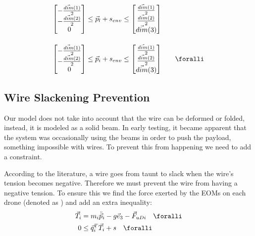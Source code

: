 \begin{equation}
\begin{array}{r @{{}\le{}} c @{{}\le{}} l @{\qquad} l}

\begin{bmatrix}
-\frac{\vec{dim}(1)}{2}\\
-\frac{\vec{dim}(2)}{2}\\
0
\end{bmatrix}
&
\vec p_l + s_{env} 
&
\begin{bmatrix}
\frac{\vec{dim}(1)}{2}\\
\frac{\vec{dim}(2)}{2}\\
\vec{dim}(3)
\end{bmatrix} \\[30pt]
\begin{bmatrix}
-\frac{\vec{dim}(1)}{2}\\
-\frac{\vec{dim}(2)}{2}\\
0
\end{bmatrix}
&
\vec p_i + s_{env} 
&
\begin{bmatrix}
\frac{\vec{dim}(1)}{2}\\
\frac{\vec{dim}(2)}{2}\\
\vec{dim}(3) 
\end{bmatrix} & \foralli \\
\end{array}
\end{equation}

\subsection{Wire Slackening Prevention}
Our model does not take into account that the wire can be deformed or folded, instead, it is modeled as a solid beam. In early testing, it became apparent that the system was occasionally using the beams in order to push the payload, something impossible with wires. To prevent this from happening we need to add a constraint.

 According to the literature\cite{Pounds2012}, a wire goes from taunt to slack when the wire's tension becomes negative. Therefore we must prevent the wire from having a negative tension. To ensure this we find the force exerted by the \ac{EOMs} on each drone (denoted as ) and add an extra inequality:
\begin{align}
 \vec T_i &= m_i\ddot{\vec p}_i - g\vec e_3 -\vec F_{uDi} \quad\foralli\\ 
0 &\le \vec q_i^T \vec T_i + s \quad\foralli	
\end{align}
